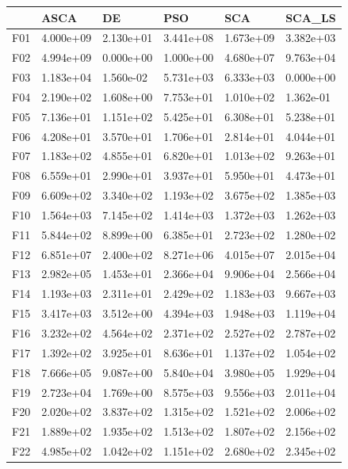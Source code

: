 \begin{tabular}{llllll}
\toprule
{} &       ASCA &         DE &        PSO &        SCA &     SCA\_LS \\
\midrule
F01  &  4.000e+09 &  2.130e+01 &  3.441e+08 &  1.673e+09 &  3.382e+03 \\
F02  &  4.994e+09 &  0.000e+00 &  1.000e+00 &  4.680e+07 &  9.763e+04 \\
F03  &  1.183e+04 &  1.560e-02 &  5.731e+03 &  6.333e+03 &  0.000e+00 \\
F04  &  2.190e+02 &  1.608e+00 &  7.753e+01 &  1.010e+02 &  1.362e-01 \\
F05  &  7.136e+01 &  1.151e+02 &  5.425e+01 &  6.308e+01 &  5.238e+01 \\
F06  &  4.208e+01 &  3.570e+01 &  1.706e+01 &  2.814e+01 &  4.044e+01 \\
F07  &  1.183e+02 &  4.855e+01 &  6.820e+01 &  1.013e+02 &  9.263e+01 \\
F08  &  6.559e+01 &  2.990e+01 &  3.937e+01 &  5.950e+01 &  4.473e+01 \\
F09  &  6.609e+02 &  3.340e+02 &  1.193e+02 &  3.675e+02 &  1.385e+03 \\
F10  &  1.564e+03 &  7.145e+02 &  1.414e+03 &  1.372e+03 &  1.262e+03 \\
F11  &  5.844e+02 &  8.899e+00 &  6.385e+01 &  2.723e+02 &  1.280e+02 \\
F12  &  6.851e+07 &  2.400e+02 &  8.271e+06 &  4.015e+07 &  2.015e+04 \\
F13  &  2.982e+05 &  1.453e+01 &  2.366e+04 &  9.906e+04 &  2.566e+04 \\
F14  &  1.193e+03 &  2.311e+01 &  2.429e+02 &  1.183e+03 &  9.667e+03 \\
F15  &  3.417e+03 &  3.512e+00 &  4.394e+03 &  1.948e+03 &  1.119e+04 \\
F16  &  3.232e+02 &  4.564e+02 &  2.371e+02 &  2.527e+02 &  2.787e+02 \\
F17  &  1.392e+02 &  3.925e+01 &  8.636e+01 &  1.137e+02 &  1.054e+02 \\
F18  &  7.666e+05 &  9.087e+00 &  5.840e+04 &  3.980e+05 &  1.929e+04 \\
F19  &  2.723e+04 &  1.769e+00 &  8.575e+03 &  9.556e+03 &  2.011e+04 \\
F20  &  2.020e+02 &  3.837e+02 &  1.315e+02 &  1.521e+02 &  2.006e+02 \\
F21  &  1.889e+02 &  1.935e+02 &  1.513e+02 &  1.807e+02 &  2.156e+02 \\
F22  &  4.985e+02 &  1.042e+02 &  1.151e+02 &  2.680e+02 &  2.345e+02 \\

\end{tabular}
